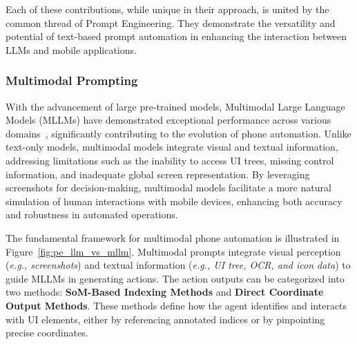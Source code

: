 Each of these contributions, while unique in their approach, is united by the common thread of Prompt Engineering. They demonstrate the versatility and potential of text-based prompt automation in enhancing the interaction between LLMs and mobile applications.

\subsubsection{Multimodal Prompting}
\label{subsubsec: Multimodal Prompt}

With the advancement of large pre-trained models, Multimodal Large Language Models (MLLMs) have demonstrated exceptional performance across various domains~\cite{achiam2023gpt,li2023blip,ye2023mplug,wang2023cogvlm,Qwen-VL,liu2024visual,Qwen2VL,chen2024internvl,chen2024far,koh2024visualwebarena,zheng2023synapse}, significantly contributing to the evolution of phone automation. Unlike text-only models, multimodal models integrate visual and textual information, addressing limitations such as the inability to access UI trees, missing control information, and inadequate global screen representation. By leveraging screenshots for decision-making, multimodal models facilitate a more natural simulation of human interactions with mobile devices, enhancing both accuracy and robustness in automated operations.

The fundamental framework for multimodal phone automation is illustrated in Figure~\ref{fig:pe_llm_vs_mllm}. Multimodal prompts integrate visual perception (\textit{e.g., screenshots}) and textual information (\textit{e.g., UI tree, OCR, and icon data}) to guide MLLMs in generating actions. The action outputs can be categorized into two methods: \textbf{SoM-Based Indexing Methods} and \textbf{Direct Coordinate Output Methods}. These methods define how the agent identifies and interacts with UI elements, either by referencing annotated indices or by pinpointing precise coordinates.


